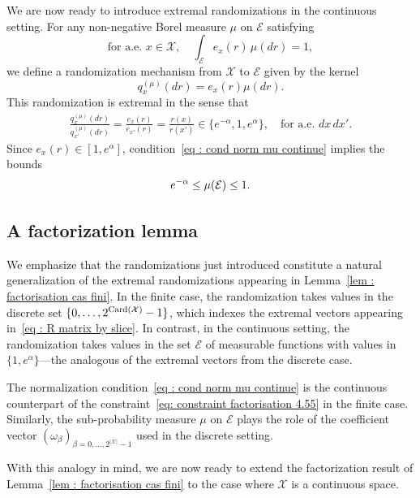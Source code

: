 \documentclass[a4paper, 11pt]{article}
\theoremstyle{definition}
\newcommand{\Card}{\mathop{\rm Card}\nolimits}
\begin{document}
{We are now ready to introduce extremal randomizations in the continuous setting. For any non-negative Borel measure $\mu$ on $\mathcal{E}$ satisfying
\begin{equation} \label{eq : cond norm mu continue}
	\text{for a.e.\ } x \in \mathcal{X}, \quad \int_{\mathcal{E}} e_x(r) \, \mu(dr) = 1,
\end{equation}
we define a randomization mechanism from $\mathcal{X}$ to $\mathcal{E}$ given by the kernel
\begin{equation} \label{eq : def random generic extr ctn}
	q^{(\mu)}_x(dr) = e_x(r) \mu(dr).
\end{equation}
This randomization is extremal in the sense that
\begin{align*}
	\frac{q^{(\mu)}_x(dr)}{q^{(\mu)}_{x'}(dr)} 
	= \frac{e_x(r)}{e_{x'}(r)} 
	= \frac{r(x)}{r(x')} \in \{e^{-\alpha}, 1, e^{\alpha}\}, \quad \text{for a.e.\ } dx \, dx'.
\end{align*}
Since $e_x(r) \in [1, e^\alpha]$, condition~\eqref{eq : cond norm mu continue} implies the bounds
\begin{equation}{\label{eq: bound mu E}}
e^{-\alpha} \leq \mu(\mathcal{E}) \leq 1.
\end{equation}

\subsection{A factorization lemma}{\label{ss: Fisher}}

We emphasize that the randomizations just introduced constitute a natural generalization of the extremal randomizations appearing in Lemma~\ref{lem : factorisation cas fini}. In the finite case, the randomization takes values in the discrete set $\{0, \dots, 2^{\Card(\mathcal{X})} - 1\}$, which indexes the extremal vectors appearing in~\eqref{eq : R matrix by slice}. In contrast, in the continuous setting, the randomization takes values in the set $\mathcal{E}$ of measurable functions with values in $\{1, e^\alpha\}$—the analogous of the extremal vectors from the discrete case.

The normalization condition~\eqref{eq : cond norm mu continue} is the continuous counterpart of the constraint~\eqref{eq: constraint factorisation 4.55} in the finite case. Similarly, the sub-probability measure $\mu$ on $\mathcal{E}$ plays the role of the coefficient vector $(\omega_\beta)_{\beta = 0, \dots, 2^{|\mathcal{X}|} - 1}$ used in the discrete setting.

\medskip
With this analogy in mind, we are now ready to extend the factorization result of Lemma~\ref{lem : factorisation cas fini} to the case where $\mathcal{X}$ is a continuous space.

}
\end{document}

